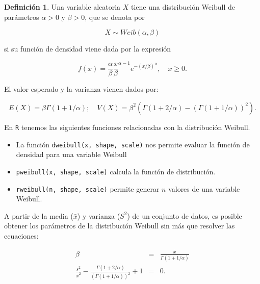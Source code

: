 \documentclass[
]{book}
\providecommand{\tightlist}{%
  \setlength{\itemsep}{0pt}\setlength{\parskip}{0pt}}
\newenvironment{yellowbox}{
  \definecolor{shadecolor}{rgb}{210, 180, 140}  
  \color{black}
  \begin{shaded}}
 {\end{shaded}}
\newenvironment{whitebox}{
  \definecolor{shadecolor}{rgb}{255, 255, 255}  
  \color{black}
  \begin{shaded}}
 {\end{shaded}}
\theoremstyle{definition}
\newtheorem{definition}{Definición}[chapter]
\theoremstyle{definition}
\theoremstyle{definition}
\theoremstyle{definition}
\theoremstyle{remark}
\begin{document}
\begin{yellowbox}

\begin{definition}
\protect\hypertarget{def:vweibull}{}\label{def:vweibull}Una variable aleatoria \(X\) tiene una distribución Weibull de parámetros \(\alpha>0\) y \(\beta>0\), que se denota por

\[X \sim Weib(\alpha, \beta)\]

si su función de densidad viene dada por la expresión

\begin{equation}
f(x)=\frac{\alpha}{\beta}\frac{x}{\beta}^{\alpha-1}e^{-(x/\beta)^{\alpha}}, \quad x \geq 0.
\label{eq:var-weibull}
\end{equation}

El valor esperado y la varianza vienen dados por:

\[E(X) = \beta \Gamma(1 + 1/\alpha); \quad V(X) = \beta^2 (\Gamma(1 + 2/\alpha) - (\Gamma(1 + 1/\alpha))^2).\]
\end{definition}

\end{yellowbox}

En \texttt{R} tenemos las siguientes funciones relacionadas con la distribución Weibull.

\begin{whitebox}

\begin{itemize}
\tightlist
\item
  La función \texttt{dweibull(x,\ shape,\ scale)} nos permite evaluar la función de densidad para una variable Weibull
\item
  \texttt{pweibull(x,\ shape,\ scale)} calcula la función de distribución.
\item
  \texttt{rweibull(n,\ shape,\ scale)} permite generar \(n\) valores de una variable Weibull.
\end{itemize}

\end{whitebox}

A partir de la media (\(\bar{x}\)) y varianza (\(S^2\)) de un conjunto de datos, es posible obtener los parámetros de la distribución Weibull sin más que resolver las ecuaciones:

\begin{eqnarray}
\beta &=& \frac{\bar{x}}{\Gamma(1 + 1/ \alpha)} \\
\frac{s^2}{\bar{x}^2} - \frac{\Gamma(1+ 2/\alpha)}{(\Gamma(1 + 1/ \alpha))^2} + 1 &=& 0.
\label{eq:estimaweibuleq}
\end{eqnarray}
\end{document}
